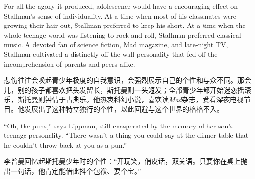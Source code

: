 \ifdefined\eng
For all the agony it produced, adolescence would have a encouraging effect on Stallman's sense of individuality. At a time when most of his classmates were growing their hair out, Stallman preferred to keep his short. At a time when the whole teenage world was listening to rock and roll, Stallman preferred classical music. A devoted fan of science fiction, Mad magazine, and late-night TV, Stallman cultivated a distinctly off-the-wall personality that fed off the incomprehension of parents and peers alike.
\fi

\ifdefined\chs
悲伤往往会唤起青少年极度的自我意识，会强烈展示自己的个性和与众不同。那会儿，别的孩子都喜欢把头发留长，斯托曼则一头短发；全部青少年都开始迷恋摇滚乐，斯托曼则钟情于古典乐。他热衷科幻小说，喜欢读\textit{Mad}杂志，爱看深夜电视节目。他发展出了这种特立独行的个性，以此回避与这个世界的格格不入。
\fi

\ifdefined\eng
``Oh, the puns,'' says Lippman, still exasperated by the memory of her son's teenage personality. ``There wasn't a thing you could say at the dinner table that he couldn't throw back at you as a pun.''
\fi

\ifdefined\chs
李普曼回忆起斯托曼少年时的个性：``开玩笑，俏皮话，双关语。只要你在桌上抛出一句话，他肯定能借此抖个包袱、耍个宝。''
\fi

